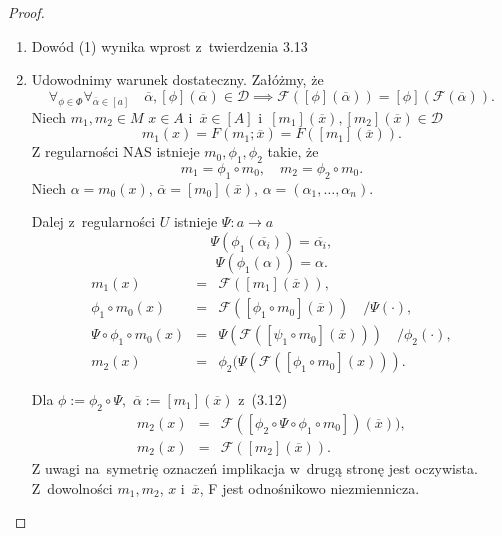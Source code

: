\documentclass[12pt,a4paper]{report}
\newcommand{\domkniecie}[1]{\left[ {#1} \right] }
\begin{document}
\begin{proof} 
\begin{enumerate}
\item
Dowód (1) wynika wprost z~twierdzenia 3.13
\item
Udowodnimy warunek dostateczny. Załóżmy, że 
\begin{equation}
\forall_{\phi \in \Phi} \forall_{\overline{\alpha} \in \domkniecie{a}} \quad \overline{\alpha}, \domkniecie{\phi}(\overline{\alpha}) \in \mathcal{D} \implies \mathcal{F}(\domkniecie{\phi}(\overline{\alpha}))=\domkniecie{\phi}(\mathcal{F}(\overline{\alpha})).
\end{equation}
Niech $m_1, m_2 \in M$ $x \in A$ i~$\overline{x} \in \domkniecie{A}$ i~$\domkniecie{m_1}(\overline{x}), \domkniecie{m_2}(\overline{x}) \in \mathcal{D}$
$$
m_1(x)=F(m_1;\overline{x})=F(\domkniecie{m_1}(\overline{x})).
$$
Z regularności NAS istnieje $m_0, \phi_1 , \phi_2$ takie, że 
$$ 
m_1=\phi_1\circ m_0, \quad m_2=\phi_2\circ m_0.
$$
Niech $\alpha=m_0(x)$, $\overline{\alpha}=\domkniecie{m_0}(\overline{x})$, $\alpha=(\alpha_1,\dots,\alpha_n)$.

Dalej z~regularności $U$ istnieje $\Psi:a \to a$
$$
 \Psi(\phi_1(\overline{\alpha_i}))=\overline{\alpha_i},
$$
$$
 \Psi(\phi_1(\alpha))=\alpha.
$$
\begin{eqnarray*}
m_1(x) & = & \mathcal{F}(\domkniecie{m_1}(\overline{x})),\\ 
\phi_1 \circ m_0(x)& = & \mathcal{F}(\domkniecie{\phi_1 \circ m_0}(\overline{x}))\quad /\Psi(\cdot),\\ 
\Psi \circ \phi_1 \circ m_0(x)&= & \Psi(\mathcal{F}(\domkniecie{\psi_1 \circ m_0}(\overline{x})))\quad /\phi_2(\cdot),\\
m_2(x)&=&\phi_2(\Psi(\mathcal{F}(\domkniecie{\phi_1 \circ m_0}(x))).
\end{eqnarray*}

Dla $\phi:=\phi_2\circ \Psi,$ $\overline{\alpha}:=\domkniecie{m_1}(\overline{x})$ z~(3.12)
\begin{eqnarray*}
m_2(x) & = & \mathcal{F}(\domkniecie{\phi_2 \circ \Psi \circ \phi_1 \circ m_0})(\overline{x})),\\
m_2(x) & = & \mathcal{F}(\domkniecie{m_2}(\overline{x})).
\end{eqnarray*}
Z uwagi na~symetrię oznaczeń implikacja w~drugą stronę jest oczywista. Z~dowolności $m_1, m_2$, $x$ i~$\overline{x}$, F jest odnośnikowo niezmiennicza.


\end{enumerate}
\end{proof}
\end{document}
